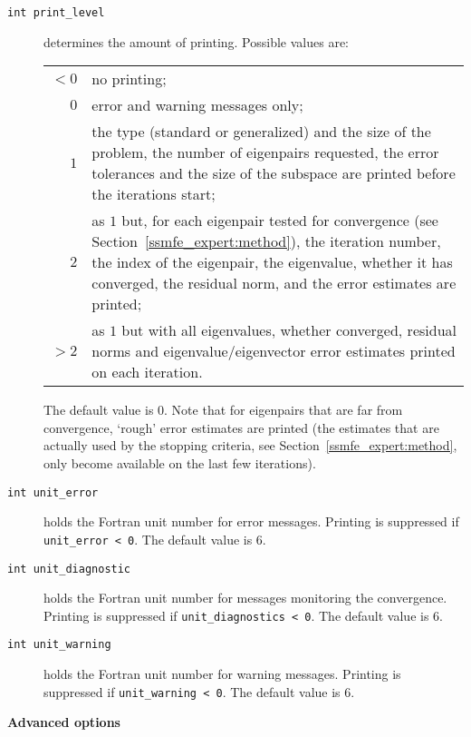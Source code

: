 \begin{description}
%
\item[\texttt{int print\_level}]
determines the amount of printing.
Possible values are:\\
%
\begin{tabular}{r@{ : }p{}}
$<0$ & no printing;\\
$0$ & error and warning messages only;\\
$1$ & the type (standard or generalized) and the size of the problem,
   the number of eigenpairs requested, the error tolerances and the size of
   the subspace are printed before the iterations start;\\
$2$ & as $1$ but, for each eigenpair tested for convergence (see
   Section~\ref{ssmfe_expert:method}), the iteration number, the index of the
   eigenpair, the eigenvalue, whether it has converged, the residual norm, and
   the error estimates are printed;\\
$>2$ & as $1$ but with all eigenvalues, whether converged, residual norms
   and eigenvalue/eigenvector error estimates printed on each iteration. 
\end{tabular}

\noindent
The default value is 0.
Note that for eigenpairs that are far from convergence,
`rough' error estimates are printed
(the estimates that are actually used by the stopping criteria,
see Section~\ref{ssmfe_expert:method}, only become available on the last few
iterations).
%
\item[\texttt{int unit\_error}]
holds the Fortran unit number for error messages.
Printing is suppressed if {\tt unit\_error < 0}.
The default value is 6. 
%
\item[\texttt{int unit\_diagnostic}]
holds the Fortran unit number for messages  monitoring the convergence.
Printing is suppressed if {\tt unit\_diagnostics < 0}.
The default value is 6. 
%
\item[\texttt{int unit\_warning}]
holds the Fortran unit number for warning messages.
Printing is suppressed if {\tt unit\_warning < 0}.
The default value is 6. 
%
\end{description}

\medskip
\noindent
{\bf Advanced options}

